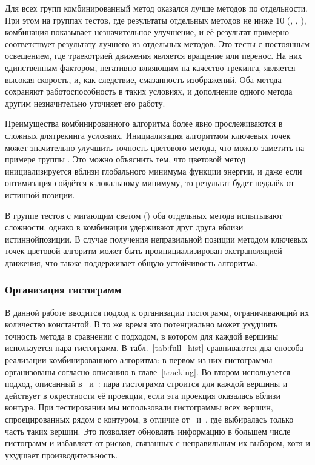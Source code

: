 
Для всех групп комбинированный метод оказался лучше методов по отдельности.
При этом на группах тестов, где результаты отдельных методов не ниже $10$
(, , ), комбинация показывает незначительное улучшение, и её результат
примерно соответствует результату лучшего из отдельных методов.
Это тесты с постоянным освещением, где траекотрией движения является вращение
или перенос.
На них единственным фактором, негативно влияющим на качество трекинга, является высокая скорость, и, как следствие, смазанность изображений.
Оба метода сохраняют работоспособность в таких условиях, и дополнение одного
метода другим незначительно уточняет его работу.

Преимущества комбинированного алгоритма более явно прослеживаются в сложных длятрекинга условиях.
Инициализация алгоритмом ключевых точек может значительно улучшить точность
цветового метода, что можно заметить на примере группы .
Это можно объяснить тем, что цветовой метод инициализируется вблизи глобального минимума функции энергии, и даже если оптимизация сойдётся к локальному
минимуму, то результат будет недалёк от истинной позиции.

В группе тестов с мигающим светом () оба отдельных метода
испытывают сложности, однако в комбинации удерживают друг друга вблизи истиннойпозиции.
В случае получения неправильной позиции методом ключевых точек цветовой
алгоритм может быть проинициализирован экстраполяцией движения, что также
поддерживает общую устойчивость алгоритма.



\subsubsection{Организация гистограмм}

В данной работе вводится подход к организации гистограмм, ограничивающий их
количество константой.
В то же время это потенциально может ухудшить точность метода в сравнении с
подходом, в котором для каждой вершины используется пара гистограмм.
В табл.~\ref{tab:full_hist} сравниваются два способа реализации
комбинированного алгоритма: в первом из них гистограммы организованы согласно
описанию в главе~\ref{tracking}.
Во втором испольузется подход, описанный в~\cite{Tjaden2017}
и~\cite{Tjaden2018}: пара гистограмм строится для каждой вершины и действует в
окрестности её проекции, если эта проекция оказалась вблизи контура.
При тестировании мы использовали гистограммы всех вершин, спроецированных рядом
с контуром, в отличие от~\cite{Tjaden2017} и~\cite{Tjaden2018}, где выбиралась
только часть таких вершин.
Это позволяет обновлять информацию в большем числе гистограмм и избавляет от
рисков, связанных с неправильным их выбором, хотя и ухудшает
производительность.

